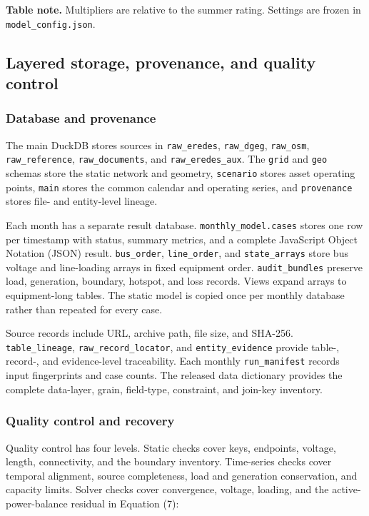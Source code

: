 \documentclass[
  10pt]{article}
\begin{document}
\textbf{Table note.} Multipliers are relative to the summer rating.
Settings are frozen in \texttt{model\_config.json}.

\subsection{Layered storage, provenance, and quality
control}\label{layered-storage-provenance-and-quality-control}

\subsubsection{Database and provenance}\label{database-and-provenance}

The main DuckDB stores sources in \texttt{raw\_eredes},
\texttt{raw\_dgeg}, \texttt{raw\_osm}, \texttt{raw\_reference},
\texttt{raw\_documents}, and \texttt{raw\_eredes\_aux}. The
\texttt{grid} and \texttt{geo} schemas store the static network and
geometry, \texttt{scenario} stores asset operating points, \texttt{main}
stores the common calendar and operating series, and \texttt{provenance}
stores file- and entity-level lineage.

Each month has a separate result database. \texttt{monthly\_model.cases}
stores one row per timestamp with status, summary metrics, and a
complete JavaScript Object Notation (JSON) result. \texttt{bus\_order},
\texttt{line\_order}, and \texttt{state\_arrays} store bus voltage and
line-loading arrays in fixed equipment order. \texttt{audit\_bundles}
preserve load, generation, boundary, hotspot, and loss records. Views
expand arrays to equipment-long tables. The static model is copied once
per monthly database rather than repeated for every case.

Source records include URL, archive path, file size, and SHA-256.
\texttt{table\_lineage}, \texttt{raw\_record\_locator}, and
\texttt{entity\_evidence} provide table-, record-, and evidence-level
traceability. Each monthly \texttt{run\_manifest} records input
fingerprints and case counts. The released data dictionary provides the
complete data-layer, grain, field-type, constraint, and join-key
inventory.

\subsubsection{Quality control and
recovery}\label{quality-control-and-recovery}

Quality control has four levels. Static checks cover keys, endpoints,
voltage, length, connectivity, and the boundary inventory. Time-series
checks cover temporal alignment, source completeness, load and
generation conservation, and capacity limits. Solver checks cover
convergence, voltage, loading, and the active-power-balance residual in
Equation (7):
\end{document}
